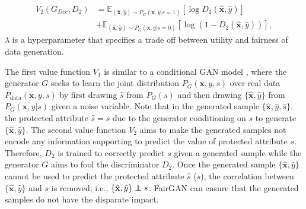 \documentclass[sigconf]{acmart}
\theoremstyle{definition}
\newcommand\independent{\protect\mathpalette{\protect\independenT}{\perp}}
\def\independenT#1#2{\mathrel{\rlap{$#1#2$}\mkern2mu{#1#2}}}
\begin{document}

\begin{equation}
\begin{split}
\label{eq:fair}
	V_2(G_{Dec}, D_2) & = \mathbb{E}_{(\hat{\mathbf{x}},\hat{y}) \sim P_G (\mathbf{x},y|s=1)}[\log D_2(\hat{\mathbf{x}},\hat{y})] \\
		 & + \mathbb{E}_{(\hat{\mathbf{x}},\hat{y}) \sim P_G (\mathbf{x},y|s=0)}[\log (1-D_2(\hat{\mathbf{x}},\hat{y}))],
\end{split}
\end{equation}
$\lambda$ is a hyperparameter that specifies a trade off between utility and fairness of data generation.


The first value function $V_1$ is similar to a conditional GAN model \cite{Mirza2014Conditional}, where the generator $G$ seeks to learn the joint distribution $P_G(\mathbf{x},y,s)$ over real data $P_{\text{data}}(\mathbf{x},y,s)$ by first drawing $\hat{s}$ from $P_{G}(s)$ and then drawing $\{\hat{\mathbf{x}},\hat{y}\}$ from $P_G(\mathbf{x},y|s)$ given a noise variable. Note that in the generated sample $\{\hat{\mathbf{x}},\hat{y}, \hat{s}\}$, the protected attribute $\hat{s}=s$ due to the generator conditioning on $s$ to generate $\{\hat{\mathbf{x}},\hat{y}\}$. The second value function $V_2$ aims to make the generated samples not encode any information supporting to predict the value of protected attribute $s$. Therefore, $D_2$ is trained to correctly predict $s$ given a generated sample while the generator $G$ aims to fool the discriminator $D_2$. Once the generated sample $\{\hat{\mathbf{x}},\hat{y}\}$ cannot be used to predict the protected attribute $\hat{s}$ ($s$), the correlation between $\{\hat{\mathbf{x}},\hat{y}\}$ and $s$ is removed, i.e., $\{\hat{\mathbf{x}},\hat{y}\} \independent s$. FairGAN can ensure that the generated samples do not have the disparate impact. 
\end{document}
